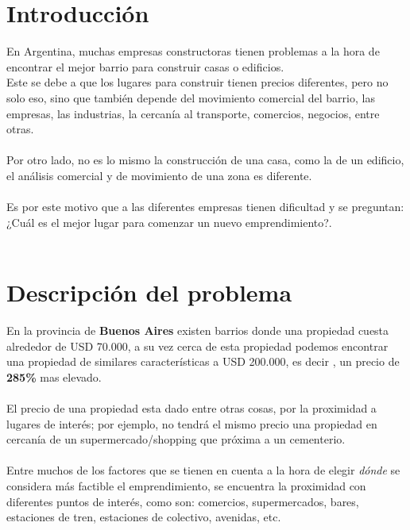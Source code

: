 \documentclass[12pt,a4paper]{tesis}
\begin{document}

\def\autor{Christian Sebastian Russo}
\def\tituloTesis{Análisis de barrios donde es conveniente construir casas o edificios.}
\def\runtitulo{La Guerra de las Galaxias: Rebelión e Imperio}
\def\runtitle{Star Wars: Rebellion and Empire}
\def\director{Coursera Capstone}
\def\codirector{IBM Data Science Capstone}
\def\lugar{Buenos Aires, 2020}



\cleardoublepage
\tableofcontents

\mainmatter
\pagestyle{headings}


\chapter{Introducción}
En Argentina, muchas empresas constructoras tienen problemas a la hora de encontrar el mejor barrio para construir casas o edificios.\\
Este se debe a que los lugares para construir tienen precios diferentes, pero no solo eso, sino que también depende del movimiento comercial del barrio, las empresas, las industrias, la cercanía al transporte, comercios, negocios, entre otras.\\\ \\
Por otro lado, no es lo mismo la construcción de una casa, como la de un edificio, el análisis comercial y de movimiento de una zona es diferente. \\ \\
Es por este motivo que a las diferentes empresas tienen dificultad y se preguntan: ¿Cuál es el mejor lugar para comenzar un nuevo emprendimiento?. \\ \\

\chapter{Descripción del problema}
En la provincia de \textbf{Buenos Aires} existen barrios donde una propiedad cuesta alrededor de USD 70.000, a su vez cerca de esta propiedad podemos encontrar una propiedad de  similares características a USD 200.000, es decir , un precio de \textbf{285\%} mas elevado. \\ \\
El precio de una propiedad esta dado entre otras cosas, por la proximidad a lugares de interés; por ejemplo, no tendrá el mismo precio una propiedad en cercanía de un supermercado/shopping que próxima a un cementerio. \\ \\
Entre muchos de los factores que se tienen en cuenta a la hora de elegir \textit{dónde} se considera más factible el emprendimiento, se encuentra la proximidad con diferentes puntos de interés, como son: comercios, supermercados, bares, estaciones de tren, estaciones de colectivo, avenidas, etc.
\end{document}
